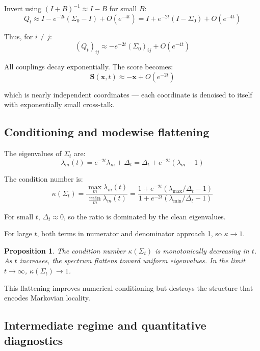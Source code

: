 \documentclass[11pt,a4paper]{article}
\theoremstyle{plain}
\newtheorem{proposition}[theorem]{Proposition}
\theoremstyle{definition}
\newcommand{\Sig}{\Sigma}
\newcommand{\Prec}{Q}
\newcommand{\delt}{\Delta_t}
\newcommand{\vct}[1]{\mathbf{#1}}
\begin{document}
Invert using $(I+B)^{-1} \approx I - B$ for small $B$:
\begin{equation}
\Prec_t \approx I - e^{-2t}(\Sig_0 - I) + O(e^{-4t}) = I + e^{-2t}(I - \Sig_0) + O(e^{-4t})
\end{equation}

Thus, for $i \ne j$:
\begin{equation}
(\Prec_t)_{ij} \approx -e^{-2t}(\Sig_0)_{ij} + O(e^{-4t})
\end{equation}

All couplings decay exponentially. The score becomes:
\begin{equation}
\vct{S}(\vct{x},t) \approx -\vct{x} + O(e^{-2t})
\end{equation}

which is nearly independent coordinates — each coordinate is denoised to itself with exponentially small cross-talk.

\subsection{Conditioning and modewise flattening}
\label{sec:conditioning}

The eigenvalues of $\Sig_t$ are:
\begin{equation}
\lambda_m(t) = e^{-2t}\lambda_m + \delt = \delt + e^{-2t}(\lambda_m - 1)
\end{equation}

The condition number is:
\begin{equation}
\kappa(\Sig_t) = \frac{\max_m \lambda_m(t)}{\min_m \lambda_m(t)} = \frac{1 + e^{-2t}(\lambda_{\max}/\delt - 1)}{1 + e^{-2t}(\lambda_{\min}/\delt - 1)}
\end{equation}

For small $t$, $\delt \approx 0$, so the ratio is dominated by the clean eigenvalues.

For large $t$, both terms in numerator and denominator approach 1, so $\kappa \to 1$.

\begin{proposition}
The condition number $\kappa(\Sig_t)$ is monotonically decreasing in $t$. As $t$ increases, the spectrum flattens toward uniform eigenvalues. In the limit $t \to \infty$, $\kappa(\Sig_t) \to 1$.
\end{proposition}

This flattening improves numerical conditioning but destroys the structure that encodes Markovian locality.

\subsection{Intermediate regime and quantitative diagnostics}
\label{sec:intermediate-diagnostics}
\end{document}
